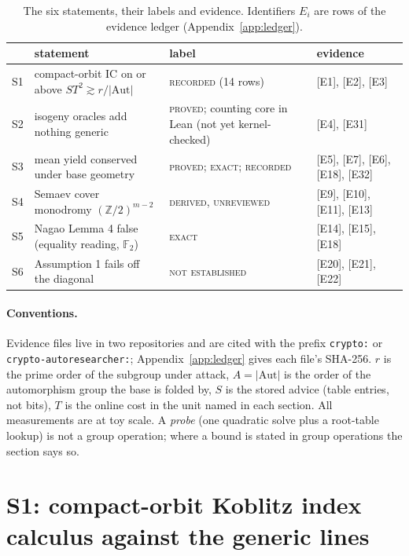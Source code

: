\documentclass[10pt,a4paper]{article}
\newcommand{\FF}{\mathbb{F}}
\newcommand{\ZZ}{\mathbb{Z}}
\newcommand{\Aut}{\mathrm{Aut}}
\newcommand{\ev}[1]{\textup{[#1]}}
\theoremstyle{definition}
\theoremstyle{remark}
\begin{document}
\begin{table}[t]
\centering\small
\begin{tabular}{@{}l p{4.6cm} p{2.9cm} p{4.4cm}@{}}
\toprule
 & statement & label & evidence \\
\midrule
S1 & compact-orbit IC on or above $ST^2 \gtrsim r/|\Aut|$ & \textsc{recorded} (14 rows) & \ev{E1}, \ev{E2}, \ev{E3} \\
S2 & isogeny oracles add nothing generic & \textsc{proved}; counting core in Lean (not yet kernel-checked) & \ev{E4}, \ev{E31} \\
S3 & mean yield conserved under base geometry & \textsc{proved}; \textsc{exact}; \textsc{recorded} & \ev{E5}, \ev{E7}, \ev{E6}, \ev{E18}, \ev{E32} \\
S4 & Semaev cover monodromy $(\ZZ/2)^{m-2}$ & \textsc{derived, unreviewed} & \ev{E9}, \ev{E10}, \ev{E11}, \ev{E13} \\
S5 & Nagao Lemma 4 false (equality reading, $\FF_2$) & \textsc{exact} & \ev{E14}, \ev{E15}, \ev{E18} \\
S6 & Assumption 1 fails off the diagonal & \textsc{not established} & \ev{E20}, \ev{E21}, \ev{E22} \\
\bottomrule
\end{tabular}
\caption{The six statements, their labels and evidence. Identifiers $E_i$ are
rows of the evidence ledger (Appendix~\ref{app:ledger}).}
\label{tab:summary}
\end{table}

\paragraph{Conventions.}
Evidence files live in two repositories and are cited with the prefix
\texttt{crypto:} or \texttt{crypto-autoresearcher:};
Appendix~\ref{app:ledger} gives each file's SHA-256. $r$ is the prime order of
the subgroup under attack, $A=|\Aut|$ is the order of the automorphism group the
base is folded by, $S$ is the stored advice (table entries, not bits), $T$ is the
online cost in the unit named in each section. All measurements are at toy
scale. A \emph{probe} (one quadratic solve plus a root-table lookup) is not a
group operation; where a bound is stated in group operations the section says
so.

\section{S1: compact-orbit Koblitz index calculus against the generic lines}
\label{sec:s1}
\end{document}
